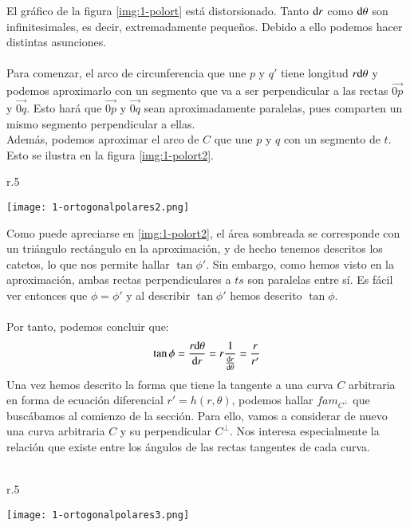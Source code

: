 El gráfico de la figura \ref{img:1-polort} está distorsionado. Tanto $\mathrm{d} r$ como $\mathrm{d} \theta$ son infinitesimales, es decir, extremadamente pequeños. Debido a ello podemos hacer distintas asunciones.\\\\
Para comenzar, el arco de circunferencia que une $p$ y $q'$ tiene longitud $r\mathrm{d} \theta$ y podemos aproximarlo con un segmento que va a ser perpendicular a las rectas $\vec{0p}$ y $\vec{0q}$. Esto hará que $\vec{0p}$ y $\vec{0q}$ sean aproximadamente paralelas, pues comparten un mismo segmento perpendicular a ellas.\\ Además, podemos aproximar el arco de $C$ que une $p$ y $q$ con un segmento de $t$. Esto se ilustra en la figura \ref{img:1-polort2}.

\begin{wrapfigure}{r}{.5\textwidth}
  \begin{center}
    \texttt{[image: 1-ortogonalpolares2.png]}
  \end{center}
  \caption{Aproximación por infinitesimales}\label{img:1-polort2}
\end{wrapfigure}

Como puede apreciarse en \ref{img:1-polort2}, el área sombreada se corresponde con un triángulo rectángulo en la aproximación, y de hecho tenemos descritos los catetos, lo que nos permite hallar $\tan\phi'$. Sin embargo, como hemos visto en la aproximación, ambas rectas perpendiculares a $ts$ son paralelas entre sí. Es fácil ver entonces que $\phi = \phi'$ y al describir $\tan\phi'$ hemos descrito $\tan\phi$.\\\\
Por tanto, podemos concluir que:
$$
\tan\phi = \frac{r\mathrm{d} \theta}{\mathrm{d} r} = r \frac{1}{\frac{\mathrm{d}r}{\mathrm{d}\theta}} = \frac{r}{r'}
$$
Una vez hemos descrito la forma que tiene la tangente a una curva $C$ arbitraria en forma de ecuación diferencial $r' = h(r,\theta)$, podemos hallar $fam_{C^\perp}$ que buscábamos al comienzo de la sección. Para ello, vamos a considerar de nuevo una curva arbitraria $C$ y su perpendicular $C^\perp$. Nos interesa especialmente la relación que existe entre los ángulos de las rectas tangentes de cada curva.\\\\
\begin{wrapfigure}{r}{.5\textwidth}
  \begin{center}
    \texttt{[image: 1-ortogonalpolares3.png]}
  \end{center}
  \caption{Angulos entre curvas ortogonales}\label{img:1-polort3}
\end{wrapfigure}

